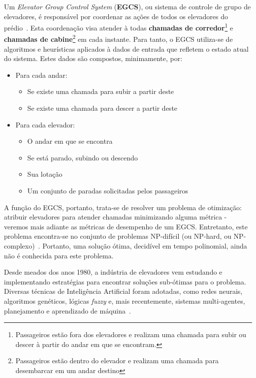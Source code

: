 Um \textit{Elevator Group Control System} (\textbf{EGCS}), ou sistema de controle de grupo de elevadores, é responsável por coordenar as ações de todos os elevadores do prédio~\cite{kuzunuki1984elevator}. Esta coordenação visa atender à todas \textbf{chamadas de corredor}\footnote{Passageiros estão fora dos elevadores e realizam uma chamada para subir ou descer à partir do andar em que se encontram.} e \textbf{chamadas de cabine}\footnote{Passageiros estão dentro do elevador e realizam uma chamada para desembarcar em um andar destino} em cada instante. Para tanto, o EGCS utiliza-se de algoritmos e heurísticas aplicados à dados de entrada que refletem o estado atual do sistema. Estes dados são compostos, minimamente, por:

\begin{itemize}
  \item Para cada andar:
  \begin{itemize}
    \item Se existe uma chamada para subir a partir deste
    \item Se existe uma chamada para descer a partir deste
  \end{itemize}
  \item Para cada elevador:
  \begin{itemize}
    \item O andar em que se encontra
    \item Se está parado, subindo ou descendo
    \item Sua lotação
    \item Um conjunto de paradas solicitadas pelos passageiros
  \end{itemize}
\end{itemize}

A função do EGCS, portanto, trata-se de resolver um problema de otimização: atribuir elevadores para atender chamadas minimizando alguma métrica - veremos mais adiante as métricas de desempenho de um EGCS. Entretanto, este problema encontra-se no conjunto de problemas NP-difícil (ou NP-hard, ou NP-complexo)~\cite{SeKo99}. Portanto, uma solução ótima, decidível em tempo polinomial, ainda não é conhecida para este problema.

Desde meados dos anos 1980, a indústria de elevadores vem estudando e implementando estratégias para encontrar soluções sub-ótimas para o problema. Diversas técnicas de Inteligência Artificial foram adotadas, como redes neurais, algoritmos genéticos, lógicas \textit{fuzzy} e, mais recentemente, sistemas multi-agentes, planejamento e aprendizado de máquina~\cite{KOEHLEROTTIGER02}.

